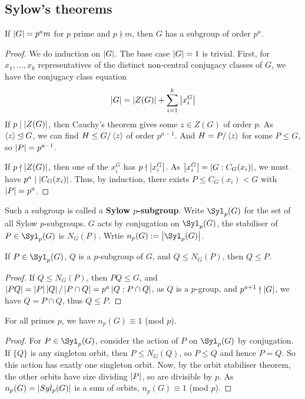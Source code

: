 \documentclass{article}
\begin{document}
\subsection{Sylow's theorems}

\begin{theorem}[Sylow 1]
    If $\left| G \right|=p^am$ for $p$ prime and $p\nmid m$, then $G$ has a subgroup of order $p^a$.
    \begin{proof}
        We do induction on $\left| G \right|$. The base case $\left| G \right|=1$ is trivial. First, for $x_1,\ldots,x_k$ representatives of the distinct non-central conjugacy classes of $G$, we have the conjugacy class equation  \[
        \left| G \right| = \left| Z(G) \right| + \sum_{i=1}^k \left| x_i^G \right|
        \] If $p\mid \left| Z(G) \right|$, then Cauchy's theorem gives some $z\in Z(G)$ of order $p$. As $\left\langle z \right\rangle\unlhd G$, we can find $H\leq G/\left\langle z \right\rangle$ of order $p^{a-1}$. And $H=P/\left\langle z \right\rangle$ for some $P\leq G$, so $\left| P \right|=p^{a-1}$.

        If $p\nmid \left| Z(G) \right|$, then one of the $x_i^G$ has $p\nmid \left| x_i^G \right|$. As $\left| x_i^G \right|=\left| G:C_G(x_i) \right|$, we must have $p^a\mid \left| C_G(x_i) \right|$. Thus, by induction, there exists $P\leq C_G(x_i) < G$ with $\left| P \right|=p^a$.
    \end{proof}
\end{theorem}

\begin{definition}
    Such a subgroup is called a \textbf{Sylow $p$-subgroup}. Write $\Syl_p(G)$ for the set of all Sylow $p$-subgroups. $G$ acts by conjugation on $\Syl_p(G)$, the stabiliser of $P\in \Syl_p(G)$ is $N_G(P)$. Wrtie $n_p(G) := \abs{\Syl_p(G)}$.
\end{definition}

\begin{lemma}
    If $P\in \Syl_p(G)$, $Q$ is a $p$-subgroup of $G$, and $Q\leq N_G(P)$, then $Q\leq P$.
    \begin{proof}
        If $Q\leq N_G(P)$, then $PQ\leq G$, and $\left| PQ \right|=\left| P \right|\left| Q \right|/\left| P\cap Q \right| = p^a\left| Q:P\cap Q \right|$, as $Q$ is a $p$-group, and $p^{a+1}\nmid \left| G \right|$, we have $Q=P\cap Q$, thus $Q\leq P$.
    \end{proof}
\end{lemma}

\begin{theorem}[Sylow 2]
    For all primes $p$, we have $n_p(G) \equiv 1$ (mod $p$).
    \begin{proof}
        For $P\in \Syl_p(G)$, consider the action of $P$ on $\Syl_p(G)$ by conjugation. If $\{Q\}$ is any singleton orbit, then $P\leq N_G(Q)$, so $P\leq Q$ and hence $P=Q$. So this action has exatly one singleton orbit. Now, by the orbit stabiliser theorem, the other orbits have size dividing $\left| P \right|$, so are divisible by $p$. As $n_p(G)=\left| Syl_p(G) \right|$ is a sum of orbits, $n_p(G)\equiv 1$ (mod $p$).
    \end{proof}
\end{theorem}
\end{document}
